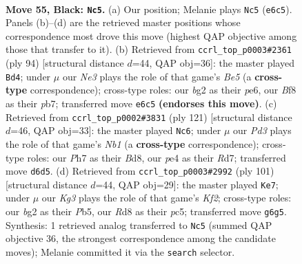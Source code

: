 \documentclass[11pt]{article}
\begin{document}
\clearpage

\begin{figure}[p]\centering
\begin{subfigure}{0.46\textwidth}\centering
\resizebox{\linewidth}{!}{%
\newchessgame
\chessboard[
  setfen={3r1b2/7p/p2pn1k1/P3p2p/2P1P3/1P3P2/1B1K2BR/8 b - - 7 55},
  showmover=false,
  pgfstyle=straightmove, color=movearrow, markmove={e6-c5}
]}
\caption{}
\end{subfigure}\hfill
\begin{subfigure}{0.46\textwidth}\centering
\resizebox{\linewidth}{!}{%
\newchessgame
\chessboard[
  setfen={2r5/1p1b1k2/4p3/p2pB2p/P7/1PP1RP2/6PK/8 w - - 0 48},
  showmover=false,
  pgfstyle=straightmove, color=movearrow, markmove={e5-d4}
]}
\caption{}
\end{subfigure}
\\[4pt]
\begin{subfigure}{0.46\textwidth}\centering
\resizebox{\linewidth}{!}{%
\newchessgame
\chessboard[
  setfen={1n1b4/p2r1kp1/5pp1/8/2N3PP/2B5/1P2KP2/R7 b - - 20 61},
  showmover=false,
  pgfstyle=straightmove, color=movearrow, markmove={b8-c6}
]}
\caption{}
\end{subfigure}\hfill
\begin{subfigure}{0.46\textwidth}\centering
\resizebox{\linewidth}{!}{%
\newchessgame
\chessboard[
  setfen={8/5k2/R3p3/1pPpP1b1/1r1P1p1p/7P/2K2BP1/8 b - - 3 51},
  showmover=false,
  pgfstyle=straightmove, color=movearrow, markmove={f7-e7}
]}
\caption{}
\end{subfigure}
\caption{\textbf{Move 55, Black: \texttt{Nc5}.} (a) Our position; Melanie plays \texttt{Nc5} (\texttt{e6c5}). Panels (b)--(d) are the retrieved master positions whose correspondence most drove this move (highest QAP objective among those that transfer to it). (b) Retrieved from \texttt{ccrl\_top\_p0003\#2361} (ply 94) [structural distance $d$=44, QAP obj=36]: the master played \texttt{Bd4}; under $\mu$ our \emph{Ne3} plays the role of that game's \emph{Be5} (a \textbf{cross-type} correspondence); cross-type roles: our \emph{b}g2 as their \emph{p}e6, our \emph{B}f8 as their \emph{p}b7; transferred move \texttt{e6c5} \textbf{(endorses this move)}. (c) Retrieved from \texttt{ccrl\_top\_p0002\#3831} (ply 121) [structural distance $d$=46, QAP obj=33]: the master played \texttt{Nc6}; under $\mu$ our \emph{Pd3} plays the role of that game's \emph{Nb1} (a \textbf{cross-type} correspondence); cross-type roles: our \emph{P}h7 as their \emph{B}d8, our \emph{p}e4 as their \emph{R}d7; transferred move \texttt{d6d5}. (d) Retrieved from \texttt{ccrl\_top\_p0003\#2992} (ply 101) [structural distance $d$=44, QAP obj=29]: the master played \texttt{Ke7}; under $\mu$ our \emph{Kg3} plays the role of that game's \emph{Kf2}; cross-type roles: our \emph{b}g2 as their \emph{P}b5, our \emph{R}d8 as their \emph{p}c5; transferred move \texttt{g6g5}. Synthesis: 1 retrieved analog transferred to \texttt{Nc5} (summed QAP objective 36, the strongest correspondence among the candidate moves); Melanie committed it via the \texttt{search} selector.}
\label{fig:thought-m109}
\end{figure}
\end{document}
